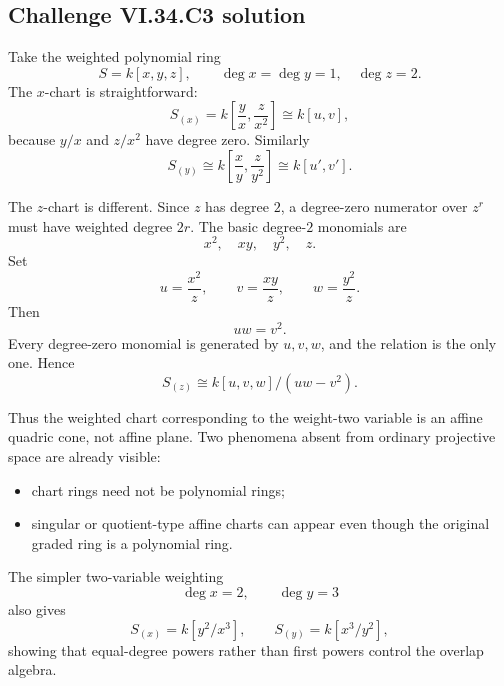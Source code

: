\subsection*{Challenge VI.34.C3 solution}
\begin{solution}
Take the weighted polynomial ring
\[
S=k[x,y,z],
\qquad
\deg x=\deg y=1,\quad \deg z=2.
\]
The \(x\)-chart is straightforward:
\[
S_{(x)}
=
k\!\left[\frac yx,\frac z{x^2}\right]
\cong k[u,v],
\]
because \(y/x\) and \(z/x^2\) have degree zero. Similarly
\[
S_{(y)}
\cong
k\!\left[\frac xy,\frac z{y^2}\right]
\cong k[u',v'].
\]

The \(z\)-chart is different. Since \(z\) has degree \(2\), a degree-zero numerator over \(z^r\) must have weighted
degree \(2r\). The basic degree-\(2\) monomials are
\[
x^2,\quad xy,\quad y^2,\quad z.
\]
Set
\[
u=\frac{x^2}{z},
\qquad
v=\frac{xy}{z},
\qquad
w=\frac{y^2}{z}.
\]
Then
\[
uw=v^2.
\]
Every degree-zero monomial is generated by \(u,v,w\), and the relation is the only one. Hence
\[
\boxed{
S_{(z)}
\cong
k[u,v,w]/(uw-v^2).
}
\]

Thus the weighted chart corresponding to the weight-two variable is an affine quadric cone, not affine plane.
Two phenomena absent from ordinary projective space are already visible:

\begin{itemize}
\item chart rings need not be polynomial rings;
\item singular or quotient-type affine charts can appear even though the original graded ring is a polynomial ring.
\end{itemize}

The simpler two-variable weighting
\[
\deg x=2,\qquad\deg y=3
\]
also gives
\[
S_{(x)}=k[y^2/x^3],
\qquad
S_{(y)}=k[x^3/y^2],
\]
showing that equal-degree powers rather than first powers control the overlap algebra.
\end{solution}

